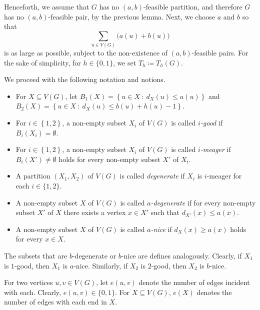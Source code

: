 \documentclass[11p]{elsarticle}
\theoremstyle{definition}
\begin{document}
Henceforth, we assume that $ G $ has no $ (a,b) $-feasible partition, and therefore  
$ G $ has no $ (a,b) $-feasible pair, by the previous lemma. Next, we choose $ a $ and $ b $ so that $$\sum_{u\in V(G)}\big(a(u)+b(u)\big)$$ is as large as possible, subject to the non-existence of $(a,b)$-feasible pairs. For the sake of simplicity, for  $ h\in\{0,1\} $, we set $ T_h\coloneqq T_h(G) $. 

We proceed with the following notation and notions.

\begin{itemize}
	\item For $ X \subseteq V(G) $, let $ B_1(X)=\left\lbrace u\in X~:~d_{X}(u)\le a(u)\right\rbrace  $ and $ B_2(X)=\left\lbrace u\in X~:~d_{X}(u)\le b(u)+h(u)-1\right\rbrace  $.
	\item For $ i\in\left\lbrace 1,2\right\rbrace$, a non-empty subset $ X_i $ of $ V(G) $ is called \textit{$i$-good} if  $B_i(X_i)=\emptyset$.
	
	\item   For $ i\in\left\lbrace 1,2\right\rbrace  $, a non-empty subset $ X_i $ of $ V(G) $ is called \textit{$i$-meager} if $ B_i(X')\neq\emptyset $ holds for every non-empty subset $ X' $ of $ X_i$.
	\item A partition $ (X_1,X_2) $ of $ V(G) $ is called \textit{degenerate} if $ X_i $ is  $i$-meager for each $ i\in\{1,2\} $.
	
	\item A non-empty subset $ X $ of $ V(G) $ is called \textit{$ a$-degenerate}  if  for every non-empty subset $ X' $ of $ X $  there exists a vertex $ x\in X' $ such that $ d_{X'}(x)\le a(x) $.
	
	\item A non-empty subset $ X $ of $ V(G) $ is called \textit{$a$-nice}   if $  d_{X}(x)\ge a(x) $ holds for every $ x\in X $.	 \end{itemize}

The subsets that are $b$-degenerate or $b$-nice are defines analogously.  Clearly, if $ X_1 $ is $ 1 $-good, then  $ X_1 $ is $a$-nice. Similarly, if $ X_2 $ is $ 2 $-good, then  $ X_2 $ is $b$-nice.

For two vertices $ u,v\in V(G) $, let $ e(u,v)$ denote the number of edges incident with each. Clearly, $ e(u,v)\in\{0,1\} $. For $X\subseteq V(G)$, $ e(X) $ denotes the number of edges with each end in $ X $. 
\end{document}
